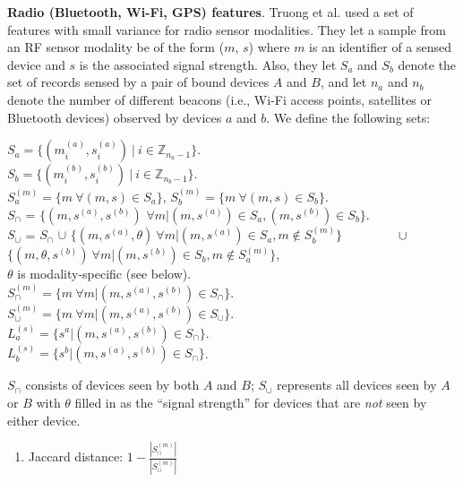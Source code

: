 {\textbf{Radio (Bluetooth, Wi-Fi, GPS) features}. Truong et al. \cite{TruongPerCom14} used a set of features with small variance for radio sensor modalities. 
They let a sample from an RF sensor modality be of
the form ($m$, $s$) where $m$ is an identifier of a sensed device and
$s$ is the associated signal strength.  Also, they let $S_a$ and $S_b$ denote the
set of records sensed by a pair of bound devices $A$ and $B$, and let
$n_a$ and $n_b$ denote the number of different beacons (i.e., Wi-Fi
access points, satellites or Bluetooth devices) observed by devices
$a$ and $b$. We define the following sets:

\noindent $S_{a} = \{(m^{(a)}_i,s^{(a)}_i)\ |\ i \in
\mathbb{Z}_{n_a-1} \}$. \\
\noindent $S_{b} = \{(m^{(b)}_i,s^{(b)}_i)\ |\ i \in
\mathbb{Z}_{n_b-1} \}$. \\
\noindent $S_a^{(m)} = \{m~ \forall (m,s) \in S_a\}$, $S_b^{(m)} = \{m~ \forall (m,s) \in S_b\}$. \\
\noindent $S_{\cap}$ = $\{(m,s^{(a)},s^{(b)})$ $\forall m |(m,s^{(a)}) 
\in S_{a}, (m,s^{(b)}) \in S_{b} \}$. \\
\noindent $S_{\cup}$ = $S_{\cap}$ $\cup$ $\{(m,s^{(a)},\theta)
~\forall m | (m,s^{(a)}) \in S_a, m \not \in S_b^{(m)} \}$ $\ \\\hspace*{1.45cm}\cup $
$\{(m,\theta, s^{(b)}) ~\forall m | (m,s^{(b)}) \in S_b, m \not \in
S_a^{(m)} \}$, \\\hspace*{1.3cm} $\theta$ is modality-specific (see below). \\
\noindent $S_{\cap}^{(m)} = \{ m ~\forall m | (m,s^{(a)},s^{(b)}) \in
S_{\cap}\}$. \\
\noindent $S_{\cup}^{(m)} = \{ m ~\forall m | (m,s^{(a)},s^{(b)}) \in
S_{\cup}\}$. \\
\noindent $L_{a}^{(s)} = \{ s^{a} | (m,s^{(a)},s^{(b)}) \in
S_{\cap}\}$. \\
\noindent
$L_{b}^{(s)} = \{ s^{b} | (m,s^{(a)},s^{(b)}) \in S_{\cap}\}$.

$S_{\cap}$ consists of devices seen by both $A$ and $B$;
$S_{\cup}$ represents all devices seen by $A$ or $B$ with
$\theta$ filled in as the ``signal strength'' for devices that are
\textit{not} seen by either device.  
\begin{enumerate}

\item \label{eq:jaccard}Jaccard distance: $1-\frac{|S^{(m)}_{\cap}|}{|S^{(m)}_{\cup}|}$



\end{enumerate}}
